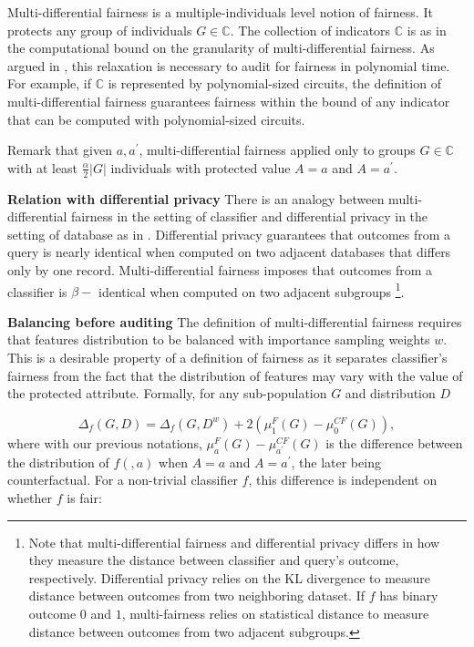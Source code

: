 \documentclass{article}
\begin{document}
Multi-differential fairness is a multiple-individuals level notion of fairness. It protects any group of individuals $G\in \mathbb{C}$. The collection of indicators $\mathbb{C}$ is as in \cite{kim2018fairness} the computational bound on the granularity of multi-differential fairness. As argued in \cite{kim2018fairness}, this relaxation is necessary to audit for fairness in polynomial time. For example, if $\mathbb{C}$ is represented by polynomial-sized circuits, the definition of multi-differential fairness guarantees fairness within the bound of any indicator that can be computed with polynomial-sized circuits.

Remark that given $a, a^{'}$, multi-differential fairness applied only to groups $G\in \mathbb{C}$ with at least  $\frac{\alpha}{2}|G|$ individuals with protected value $A=a$ and $A=a^{'}$. 

\textbf{Relation with differential privacy}
There is an analogy between multi-differential fairness in the setting of classifier and differential privacy in the setting of database as in  \citet{dwork2014algorithmic}. Differential privacy guarantees that outcomes from a query is nearly identical when computed on two adjacent databases that differs only by one record. Multi-differential fairness imposes that outcomes from a classifier is $\beta-$ identical when computed on two adjacent subgroups \footnote{Note that multi-differential fairness and differential privacy differs in how they measure the distance between classifier and query's outcome, respectively. Differential privacy relies on the KL divergence to measure distance between outcomes from two neighboring dataset. If $f$ has binary outcome $0$ and $1$, multi-fairness relies on statistical distance to measure distance between outcomes from two adjacent subgroups.}. 

\textbf{Balancing before auditing}
The definition of multi-differential fairness requires that features distribution to be balanced with importance sampling weights $w$. This is a desirable property of a definition of fairness as it separates classifier's fairness from the fact that the distribution of features may vary with the value of the protected attribute. Formally, for any sub-population $G$ and distribution $D$

\begin{equation}
    \Delta_{f}(G, D) = \Delta_{f}(G, D^{w}) + 2(\mu^{F}_{1}(G) -\mu^{CF}_{0}(G)), 
\end{equation} 
where with our previous notations, $\mu^{F}_{a}(G) -\mu^{CF}_{a^{'}}(G)$ is the difference between the distribution of $f(, a)$ when $A=a$ and $A=a^{'}$, the later being counterfactual. For a non-trivial classifier $f$, this difference is independent on whether $f$ is fair:
\end{document}
